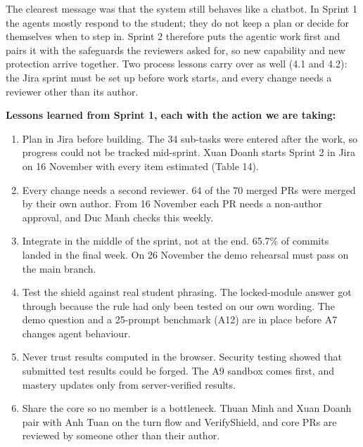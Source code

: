 \documentclass[11pt,a4paper]{article}
\begin{document}
The clearest message was that the system still behaves like a chatbot. In Sprint 1 the agents mostly respond to the student; they do not keep a plan or decide for themselves when to step in. Sprint 2 therefore puts the agentic work first and pairs it with the safeguards the reviewers asked for, so new capability and new protection arrive together. Two process lessons carry over as well (4.1 and 4.2): the Jira sprint must be set up before work starts, and every change needs a reviewer other than its author.

\textbf{Lessons learned from Sprint 1, each with the action we are taking:}

\begin{enumerate}
\item Plan in Jira before building. The 34 sub-tasks were entered after the work, so progress could not be tracked mid-sprint. Xuan Doanh starts Sprint 2 in Jira on 16 November with every item estimated (Table 14).
\item Every change needs a second reviewer. 64 of the 70 merged PRs were merged by their own author. From 16 November each PR needs a non-author approval, and Duc Manh checks this weekly.
\item Integrate in the middle of the sprint, not at the end. 65.7\% of commits landed in the final week. On 26 November the demo rehearsal must pass on the main branch.
\item Test the shield against real student phrasing. The locked-module answer got through because the rule had only been tested on our own wording. The demo question and a 25-prompt benchmark (A12) are in place before A7 changes agent behaviour.
\item Never trust results computed in the browser. Security testing showed that submitted test results could be forged. The A9 sandbox comes first, and mastery updates only from server-verified results.
\item Share the core so no member is a bottleneck. Thuan Minh and Xuan Doanh pair with Anh Tuan on the turn flow and VerifyShield, and core PRs are reviewed by someone other than their author.
\end{enumerate}
\end{document}
